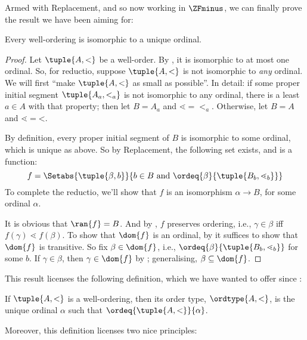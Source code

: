 \documentclass[../../../include/open-logic-section]{subfiles}
\begin{document}

Armed with Replacement, and so now working in $\ZFminus$, we can finally prove the result we have been aiming for:

\begin{thm}
Every well-ordering is isomorphic to a unique ordinal. 
\end{thm}

\begin{proof}
Let $\tuple{A, <}$ be a well-order. By
, it is isomorphic to at most one
ordinal. So, for reductio, suppose $\tuple{A, <}$ is not isomorphic to
\emph{any} ordinal. We will first ``make $\tuple{A, <}$ as small as
possible''. In detail: if some proper initial segment $\tuple{A_a,
<_a}$ is not isomorphic to any ordinal, there is a least $a \in A$
with that property; then let $B = A_a$ and $\mathord{\lessdot} =
\mathord{<_a}$. Otherwise, let $B = A$ and $\mathord{\lessdot} =
\mathord{<}$. 

By definition, every proper initial segment of $B$ is isomorphic to
some ordinal, which is unique as above. So
by Replacement, the following set exists, and is a function:
\[
	f = \Setabs{\tuple{\beta, b}}{b \in B\text{ and }\ordeq{\beta}{\tuple{B_b, \lessdot_b}}}
\]
To complete the reductio, we'll show that $f$ is an isomorphism
$\alpha \to B$, for some ordinal $\alpha$. 

It is obvious that $\ran{f}
= B$. And by , $f$ preserves ordering,
i.e., $\gamma \in \beta$ iff $f(\gamma) \lessdot f(\beta)$. To show that $\dom{f}$ is an ordinal, by
 it suffices to show that
$\dom{f}$ is transitive. So fix $\beta \in \dom{f}$, i.e.,
$\ordeq{\beta}{\tuple{B_b, \lessdot_b}}$ for some $b$. If $\gamma \in
\beta$, then $\gamma \in \dom{f}$ by
; generalising, $\beta \subseteq
\dom{f}$.
\end{proof}

This result licenses the following definition, which we have wanted to
offer since :

\begin{defn}
If $\tuple{A, <}$ is a well-ordering, then its order type,
$\ordtype{A, <}$, is the unique ordinal $\alpha$ such that
$\ordeq{\tuple{A, < }}{\alpha}$.
\end{defn}

Moreover, this definition licenses two nice principles:
\end{document}
